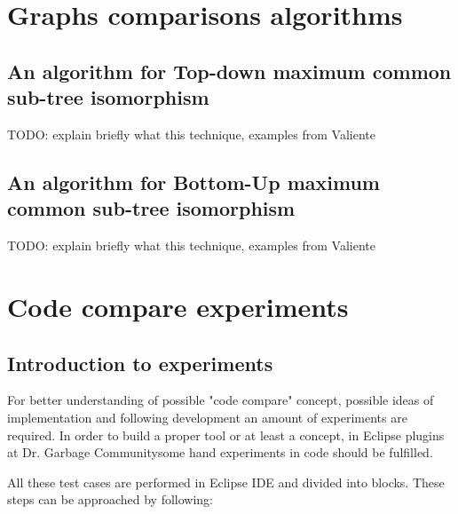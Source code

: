 \documentclass{report}
\begin{document}
\chapter{Graphs comparisons algorithms}
\label{cha:Algorithms}

\section{An algorithm for Top-down maximum common sub-tree isomorphism }
\label{sec:topdown}

TODO: explain briefly what this technique, examples from Valiente

\section{An algorithm for Bottom-Up maximum common sub-tree isomorphism }

TODO: explain briefly what this technique, examples from Valiente



\chapter{Code compare experiments}
\label{chap:experimental}
\section{Introduction to experiments}

For better understanding of possible "code compare" concept, possible ideas of implementation and following development an amount of experiments are required.
In order to build a proper tool or at least a concept, in Eclipse plugins at Dr. Garbage Community\textregistered \enspace some hand experiments in code should be fulfilled.

All these test cases are performed in Eclipse IDE \cite{eclipse_site} and divided into blocks. These steps can be approached by following:
\end{document}
